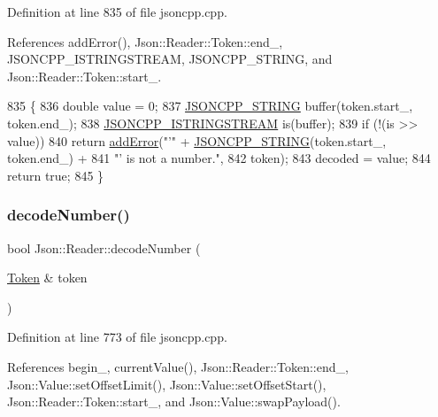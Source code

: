 Definition at line 835 of file jsoncpp.\+cpp.



References add\+Error(), Json\+::\+Reader\+::\+Token\+::end\+\_\+, J\+S\+O\+N\+C\+P\+P\+\_\+\+I\+S\+T\+R\+I\+N\+G\+S\+T\+R\+E\+AM, J\+S\+O\+N\+C\+P\+P\+\_\+\+S\+T\+R\+I\+NG, and Json\+::\+Reader\+::\+Token\+::start\+\_\+.


\begin{DoxyCode}
835                                                       \{
836   \textcolor{keywordtype}{double} value = 0;
837   \hyperlink{json_8h_a1e723f95759de062585bc4a8fd3fa4be}{JSONCPP\_STRING} buffer(token.start\_, token.end\_);
838   \hyperlink{json_8h_a1b5d70fe3d83273d200193177ded4c25}{JSONCPP\_ISTRINGSTREAM} is(buffer);
839   \textcolor{keywordflow}{if} (!(is >> value))
840     \textcolor{keywordflow}{return} \hyperlink{class_json_1_1_reader_af02176a1d2786b4415bbb00a1b10bb6b}{addError}(\textcolor{stringliteral}{"'"} + \hyperlink{json_8h_a1e723f95759de062585bc4a8fd3fa4be}{JSONCPP\_STRING}(token.start\_, token.end\_) +
841                         \textcolor{stringliteral}{"' is not a number."},
842                     token);
843   decoded = value;
844   \textcolor{keywordflow}{return} \textcolor{keyword}{true};
845 \}
\end{DoxyCode}
\mbox{\label{class_json_1_1_reader_a442d1f23edf0f4350f5eeab3ee3f7d46}} 
\subsubsection{\texorpdfstring{decode\+Number()}{decodeNumber()}\hspace{0.1cm}{\footnotesize\ttfamily [1/2]}}
{\footnotesize\ttfamily bool Json\+::\+Reader\+::decode\+Number (\begin{DoxyParamCaption}\item[{\hyperlink{class_json_1_1_reader_1_1_token}{Token} \&}]{token }\end{DoxyParamCaption})\hspace{0.3cm}{\ttfamily [private]}}



Definition at line 773 of file jsoncpp.\+cpp.



References begin\+\_\+, current\+Value(), Json\+::\+Reader\+::\+Token\+::end\+\_\+, Json\+::\+Value\+::set\+Offset\+Limit(), Json\+::\+Value\+::set\+Offset\+Start(), Json\+::\+Reader\+::\+Token\+::start\+\_\+, and Json\+::\+Value\+::swap\+Payload().



